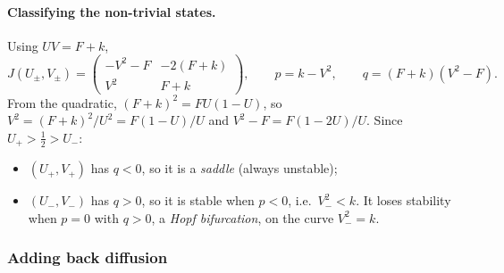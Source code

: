 \documentclass[a4paper, 11pt]{article}
\begin{document}
\paragraph{Classifying the non-trivial states.}
Using $UV = F + k$,
\begin{equation}
	\label{eq:gs-jacobian-nontrivial}
	J(U_\pm, V_\pm) =
	\begin{pmatrix}
		-V^2 - F & -2(F + k) \\
		V^2      & F + k
	\end{pmatrix},
	\qquad p = k - V^2, \qquad q = (F + k)(V^2 - F) .
\end{equation}
From the quadratic, $(F + k)^2 = FU(1 - U)$, so $V^2 = (F + k)^2/U^2 = F(1 - U)/U$ and $V^2 - F = F(1 - 2U)/U$. Since $U_+ > \tfrac12 > U_-$:
\begin{itemize}
	\item $(U_+, V_+)$ has $q < 0$, so it is a \emph{saddle} (always unstable);
	\item $(U_-, V_-)$ has $q > 0$, so it is stable when $p < 0$, i.e.\ $V_-^2 < k$. It loses stability when $p = 0$ with $q > 0$, a \emph{Hopf bifurcation}, on the curve $V_-^2 = k$.
\end{itemize}

%

\subsubsection*{Adding back diffusion}
\end{document}
